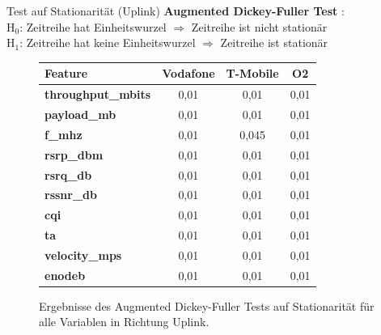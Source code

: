 \begin{frame}{Test auf Stationarität (Uplink)}
	\textbf{Augmented Dickey-Fuller Test} \cite{time_series_analysis}:\\
	H$_0$: Zeitreihe hat Einheitswurzel $\Rightarrow$ Zeitreihe ist nicht stationär\\
	H$_1$: Zeitreihe hat keine Einheitswurzel $\Rightarrow$ Zeitreihe ist stationär
	\begin{figure}
		\begin{tabular}{l||c|c|c}
			\textbf{Feature} & \textbf{Vodafone} & \textbf{T-Mobile} & \textbf{O2} \\
			\hline\hline
			\textbf{throughput\_mbits} & 0,01 & 0,01 & 0,01 \\
			\textbf{payload\_mb} & 0,01 & 0,01 & 0,01 \\
			\textbf{f\_mhz} & 0,01 & 0,045 & 0,01 \\
			\textbf{rsrp\_dbm} & 0,01 & 0,01 & 0,01 \\
			\textbf{rsrq\_db} & 0,01 & 0,01 & 0,01 \\
			\textbf{rssnr\_db} & 0,01 & 0,01 & 0,01 \\
			\textbf{cqi} & 0,01 & 0,01 & 0,01 \\
			\textbf{ta} & 0,01 & 0,01 & 0,01 \\
			\textbf{velocity\_mps} & 0,01 & 0,01 & 0,01 \\
			\textbf{enodeb} & 0,01 & 0,01 & 0,01 \\
		\end{tabular}
		\caption{Ergebnisse des Augmented Dickey-Fuller Tests auf Stationarität für alle Variablen in Richtung Uplink.}
	\end{figure}
\end{frame}

